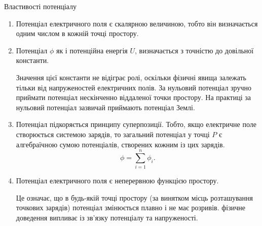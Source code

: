\documentclass{beamer}
\begin{document}
\begin{frame}{Властивості потенціалу}
	\begin{enumerate}\small\justifying
		\item Потенціал електричного поля є \alert{скалярною величиною},
		      тобто він визначається одним числом в кожній точці простору.
		\item Потенціал $\phi$ як і потенційна енергія $U$, визначається
		      \alert{з точністю до довільної константи}.

		      \begin{alertblock}{}\justifying\scriptsize
			      Значення цієї константи не відіграє ролі, оскільки фізичні явища залежать
			      тільки від напруженостей електричних полів. За нульовий потенціал зручно
			      приймати потенціал нескінченно віддаленої точки простору. На практиці за
			      нульовий потенціал зазвичай приймають потенціал Землі.
		      \end{alertblock}

		\item Потенціал підкоряється принципу суперпозиції. Тобто, якщо
		      електричне поле створюється системою зарядів, то загальний
		      потенціал у точці $P$ є \alert{алгебраїчною сумою
			      потенціалів}, створених кожним із цих зарядів.
		      \begin{equation*}
			      \phi = \sum_{i = 1}^{n} \phi_i.
		      \end{equation*}

		\item Потенціал електричного поля є \alert{неперервною функцією
			      простору}.

		      \begin{block}{}\justifying\scriptsize
			      Це означає, що в будь-якій точці простору (за
			      винятком  місць розташування точкових зарядів) потенціал
			      змінюється плавно і
			      не має розривів. \alert{фізичне доведення випливає із зв'язку
				      потенціалу та напруженості}.
		      \end{block}
	\end{enumerate}
\end{frame}
\end{document}
